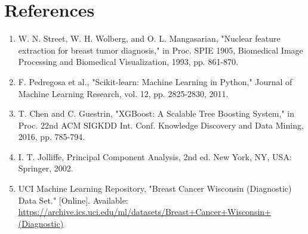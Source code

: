 \documentclass[12pt,a4paper]{article}
\begin{document}
\section{References}
\label{sec:org85d596d}

\begin{enumerate}
\item W. N. Street, W. H. Wolberg, and O. L. Mangasarian, "Nuclear feature extraction for breast
tumor diagnosis," in Proc. SPIE 1905, Biomedical Image Processing and Biomedical
Visualization, 1993, pp. 861-870.
\item F. Pedregosa et al., "Scikit-learn: Machine Learning in Python," Journal of Machine Learning
Research, vol. 12, pp. 2825-2830, 2011.
\item T. Chen and C. Guestrin, "XGBoost: A Scalable Tree Boosting System," in Proc. 22nd ACM SIGKDD
Int. Conf. Knowledge Discovery and Data Mining, 2016, pp. 785-794.
\item I. T. Jolliffe, Principal Component Analysis, 2nd ed. New York, NY, USA: Springer, 2002.
\item UCI Machine Learning Repository, "Breast Cancer Wisconsin (Diagnostic) Data Set." [Online].
Available: \url{https://archive.ics.uci.edu/ml/datasets/Breast+Cancer+Wisconsin+(Diagnostic)}
\end{enumerate}
\end{document}
